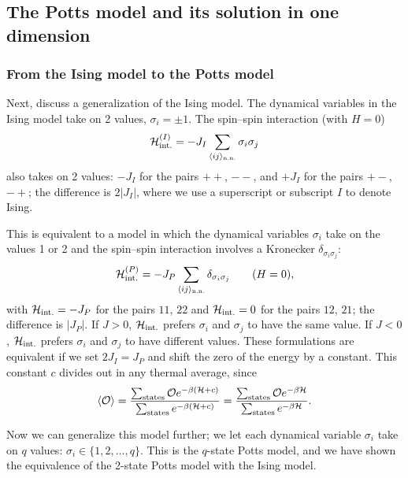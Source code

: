 \subsection{The Potts model and its solution in one dimension}
\subsubsection*{From the Ising model to the Potts model}

Next, discuss a generalization of the Ising model. The dynamical variables in the Ising model take on 2 values,
$\sigma_i = \pm1$. The spin--spin interaction (with $H = 0$)
\begin{equation}
  \mathcal{H}_{\text{int.}}^{(I)} = -J_I\sum_{\langle ij\rangle_{\text{n.n.}}}\sigma_i\sigma_j
\end{equation}
also takes on 2 values: $-J_I$ for the pairs $++$, $--$, and $+J_I$ for the pairs $+-$, $-+$; the difference is $2|J_I|$,
where we use a superscript or subscript $I$ to denote Ising.

This is equivalent to a model in which the dynamical variables $\sigma_i$ take on the values 1 or 2 and the spin--spin
interaction involves a Kronecker $\delta_{\sigma_i\sigma_j}$:
\begin{equation}
  \mathcal{H}_{\text{int.}}^{(P)} = -J_P\sum_{\langle ij\rangle_{\text{n.n.}}}\delta_{\sigma_i\sigma_j}\qquad(H = 0),
\end{equation}
with $\mathcal{H}_{\text{int.}} = -J_P$ for the pairs $11$, $22$ and $\mathcal{H}_{\text{int.}} = 0$ for the pairs $12$, $21$; the difference
is $|J_P|$. If $J>0$, $\mathcal{H}_{\text{int.}}$ prefers $\sigma_i$ and $\sigma_j$ to have the same value. If $J<0$,
$\mathcal{H}_{\text{int.}}$ prefers $\sigma_i$ and $\sigma_j$ to have different values. These formulations are equivalent if we set
$2J_I = J_P$ and shift the zero of the energy by a constant. This constant $c$ divides out in any thermal average, since
\begin{equation}
  \langle \mathcal O\rangle = \frac{\sum_{\text{states}}\mathcal Oe^{-\beta(\mathcal{H}+c)}}{\sum_{\text{states}}e^{-\beta(\mathcal{H}+c)}}
  = \frac{\sum_{\text{states}}\mathcal Oe^{-\beta\mathcal{H}}}{\sum_{\text{states}}e^{-\beta\mathcal{H}}}.
\end{equation}

Now we can generalize this model further; we let each dynamical variable $\sigma_i$ take on $q$ values:
$\sigma_i\in\{1,2,\ldots,q\}$. This is the $q$-state Potts model, and we have shown the equivalence of the 2-state Potts
model with the Ising model.

